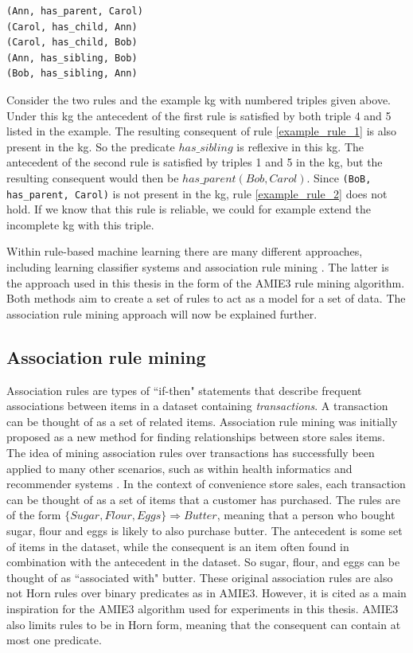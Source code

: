 \begin{example}[A simple KG.]
\begin{lstlisting}[]
(Ann, has_parent, Carol)
(Carol, has_child, Ann)
(Carol, has_child, Bob)
(Ann, has_sibling, Bob)
(Bob, has_sibling, Ann)
\end{lstlisting}
\label{mini_KG_rules}
\end{example}


Consider the two rules and the example \gls{kg} with numbered triples given above. Under this \gls{kg} the antecedent of the first rule is satisfied by both triple 4 and 5 listed in the example. The resulting consequent of rule \ref{example_rule_1} is also present in the \gls{kg}. So the predicate $has\_sibling$ is reflexive in this \gls{kg}. The antecedent of the second rule is satisfied by triples 1 and 5 in the \gls{kg}, but the resulting consequent would then be $has\_parent(Bob, Carol)$. Since \texttt{(BoB, has\_parent, Carol)} is not present in the \gls{kg}, rule \ref{example_rule_2} does not hold. If we know that this rule is reliable, we could for example extend the incomplete \gls{kg} with this triple.

Within rule-based machine learning there are many different approaches, including learning classifier systems \cite{sigaud2007learning} and association rule mining \cite{agrawal1993mining}. The latter is the approach used in this thesis in the form of the AMIE3 rule mining algorithm. Both methods aim to create a set of rules to act as a model for a set of data. The association rule mining approach will now be explained further.


\subsection{Association rule mining}
Association rules \cite{agrawal1993mining} are types of ``if-then" statements that describe frequent associations between items in a dataset containing \textit{transactions}. A transaction can be thought of as a set of related items. Association rule mining was initially proposed as a new method for finding relationships between store sales items. The idea of mining association rules over transactions has successfully been applied to many other scenarios, such as within health informatics and recommender systems \cite{altaf2017applications, lin2002efficient}. In the context of convenience store sales, each transaction can be thought of as a set of items that a customer has purchased. The rules are of the form $\{Sugar, Flour, Eggs\} \Rightarrow Butter$, meaning that a person who bought sugar, flour and eggs is likely to also purchase butter. The antecedent is some set of items in the dataset, while the consequent is an item often found in combination with the antecedent in the dataset.  So sugar, flour, and eggs can be thought of as ``associated with" butter. These original association rules are also not Horn rules over binary predicates as in AMIE3. However, it is cited as a main inspiration for the AMIE3 algorithm used for experiments in this thesis. AMIE3 also limits rules to be in Horn form, meaning that the consequent can contain at most one predicate.

